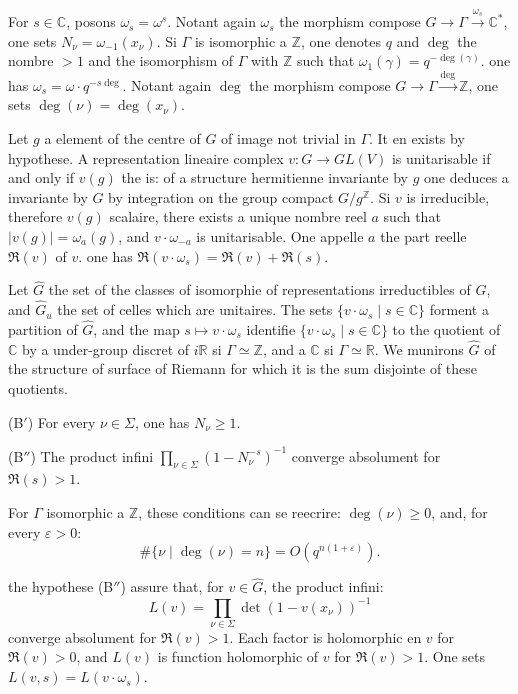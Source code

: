 \documentclass[12pt,a4paper]{article}
\theoremstyle{plain}
\theoremstyle{definition}
\theoremstyle{remark}
\newcommand{\CC}{{\mathbb{C}}}
\newcommand{\RR}{{\mathbb{R}}}
\newcommand{\ZZ}{{\mathbb{Z}}}
\begin{document}
For $s \in \CC$, posons $\omega_s = \omega^s$. Notant again $\omega_s$ the morphism compose $G \to \Gamma \xrightarrow{\omega_s} \CC^*$, one sets $N_\nu = \omega_{-1}(x_\nu)$. Si $\Gamma$ is isomorphic a $\ZZ$, one denotes $q$ and $\deg$ the nombre $> 1$ and the isomorphism of $\Gamma$ with $\ZZ$ such that $\omega_1(\gamma) = q^{-\deg(\gamma)}$. one has $\omega_s = \omega \cdot q^{-s \deg}$. Notant again $\deg$ the morphism compose $G \to \Gamma \xrightarrow{\deg} \ZZ$, one sets $\deg(\nu) = \deg(x_\nu)$.

Let $g$ a element of the centre of $G$ of image not trivial in $\Gamma$. It en exists by hypothese. A representation lineaire complex $v : G \to GL(V)$ is unitarisable if and only if $v(g)$ the is: of a structure hermitienne invariante by $g$ one deduces a invariante by $G$ by integration on the group compact $G/g^\ZZ$. Si $v$ is irreducible, therefore $v(g)$ scalaire, there exists a unique nombre reel $a$ such that $|v(g)| = \omega_a(g)$, and $v \cdot \omega_{-a}$ is unitarisable. One appelle $a$ the part reelle $\Re(v)$ of $v$. one has $\Re(v \cdot \omega_s) = \Re(v) + \Re(s)$.

Let $\widehat{G}$ the set of the classes of isomorphie of representations irreductibles of $G$, and $\widehat{G}_u$ the set of celles which are unitaires. The sets $\{v \cdot \omega_s \mid s \in \CC\}$ forment a partition of $\widehat{G}$, and the map $s \mapsto v \cdot \omega_s$ identifie $\{v \cdot \omega_s \mid s \in \CC\}$ to the quotient of $\CC$ by a under-group discret of $i\RR$ si $\Gamma \simeq \ZZ$, and a $\CC$ si $\Gamma \simeq \RR$. We munirons $\widehat{G}$ of the structure of surface of Riemann for which it is the sum disjointe of these quotients.


(B$'$) For every $\nu \in \Sigma$, one has $N_\nu \geq 1$.

(B$''$) The product infini $\prod_{\nu \in \Sigma} (1 - N_\nu^{-s})^{-1}$ converge absolument for $\Re(s) > 1$.

For $\Gamma$ isomorphic a $\ZZ$, these conditions can se reecrire: $\deg(\nu) \geq 0$, and, for every $\varepsilon > 0$:
\[ \#\{\nu \mid \deg(\nu) = n\} = O(q^{n(1+\varepsilon)}). \]

the hypothese (B$''$) assure that, for $v \in \widehat{G}$, the product infini:
\[ L(v) = \prod_{\nu \in \Sigma} \det(1 - v(x_\nu))^{-1} \]
converge absolument for $\Re(v) > 1$. Each factor is holomorphic en $v$ for $\Re(v) > 0$, and $L(v)$ is function holomorphic of $v$ for $\Re(v) > 1$. One sets $L(v, s) = L(v \cdot \omega_s)$.
\end{document}

